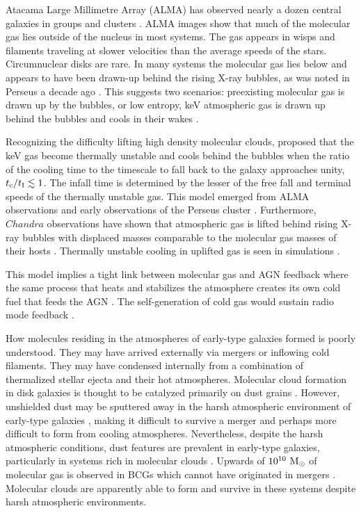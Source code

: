 \documentclass[iop]{emulateapj}
\begin{document}
Atacama Large Millimetre Array (ALMA) has observed nearly a dozen central galaxies in groups and clusters \citep{David:14, McNamara:14, Russell:14, Russell:16, Russell:17a, Russell:17b, Tremblay:16, Vantyghem:16, Vantyghem:17, Simionescu:18}.  ALMA images show that much of the molecular gas lies outside of the nucleus in most systems. The gas appears in wisps and filaments traveling at slower velocities than the average speeds of the stars. Circumnuclear disks are rare. In many systems the molecular gas lies below and appears to have been drawn-up behind the rising X-ray bubbles, as was noted in Perseus a decade ago \citep{Fabian:03, Hatch:06, Salome:11, Hlavacek:15, Yang:16}.  This suggests two scenarios: preexisting molecular gas is drawn up by the bubbles, or low entropy, keV atmospheric gas is drawn up behind the bubbles and cools in their wakes \citep{Salome:11}. 

Recognizing the difficulty lifting high density molecular clouds, \citet{McNamara:16} proposed that the keV gas become thermally unstable and cools behind the bubbles when the ratio of the cooling time to the timescale to fall back to the galaxy approaches unity, $t_{\rm c}/t_{\rm I} \lesssim 1$. The infall time is determined by the lesser of the free fall and terminal speeds of the thermally unstable gas. This model emerged from ALMA observations and early observations of the Perseus cluster \citep{Russell:17a}. Furthermore, $Chandra$ observations have shown that atmospheric gas is lifted  behind rising X-ray bubbles with displaced masses comparable to the molecular gas masses of their hosts \citep{Fabian:02, Simionescu:10, Gitti:11, Werner:12, Kirkpatrick:15}. Thermally unstable cooling in uplifted gas is seen in  simulations \citep{Revaz:08, Li:14}. 

This model implies a tight link between molecular gas and AGN feedback where the same process that heats and stabilizes the atmosphere creates its own cold fuel that feeds the AGN \citep{Gaspari:12}.  The self-generation of cold gas would sustain radio mode feedback \citep{McNamara:16}.  

How molecules residing in the atmospheres of early-type galaxies formed is poorly understood.  They may have arrived externally via mergers or inflowing cold filaments. They may have condensed internally from a combination of thermalized stellar ejecta and their hot atmospheres. Molecular cloud formation in disk galaxies is thought to be catalyzed primarily on dust grains \citep{LeBourlot:12}.  However, unshielded dust may be sputtered away in the harsh atmospheric environment of early-type galaxies \citep{Draine:79}, making it difficult to survive a merger and perhaps more difficult to form from cooling atmospheres.  Nevertheless, despite the harsh atmospheric conditions, dust features are prevalent in early-type galaxies, particularly in systems rich in molecular clouds \citep{Russell:19, Werner:19}. Upwards of $10^{10} ~\rm M_\odot$ of molecular gas is observed in BCGs \citep{Edge:01} which cannot have originated in mergers \citep{Pulido:17}. Molecular clouds are apparently able to form and survive in these systems despite harsh atmospheric environments.
\end{document}
